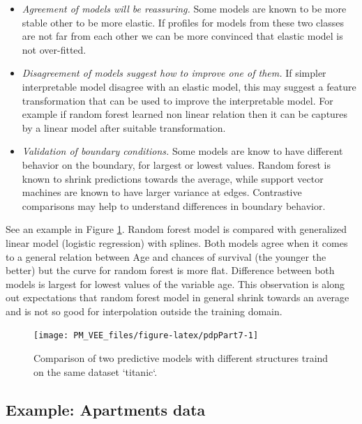 \documentclass[12pt,]{krantz}
\providecommand{\tightlist}{%
  \setlength{\itemsep}{0pt}\setlength{\parskip}{0pt}}
\begin{document}
\begin{itemize}
\tightlist
\item
  \emph{Agreement of models will be reassuring.} Some models are known to be more stable other to be more elastic. If profiles for models from these two classes are not far from each other we can be more convinced that elastic model is not over-fitted.
\item
  \emph{Disagreement of models suggest how to improve one of them.} If simpler interpretable model disagree with an elastic model, this may suggest a feature transformation that can be used to improve the interpretable model. For example if random forest learned non linear relation then it can be captures by a linear model after suitable transformation.
\item
  \emph{Validation of boundary conditions.} Some models are know to have different behavior on the boundary, for largest or lowest values. Random forest is known to shrink predictions towards the average, while support vector machines are known to have larger variance at edges. Contrastive comparisons may help to understand differences in boundary behavior.
\end{itemize}

See an example in Figure \ref{fig:pdpPart7}. Random forest model is compared with generalized linear model (logistic regression) with splines. Both models agree when it comes to a general relation between Age and chances of survival (the younger the better) but the curve for random forest is more flat. Difference between both models is largest for lowest values of the variable age. This observation is along out expectations that random forest model in general shrink towards an average and is not so good for interpolation outside the training domain.

\begin{figure}

{\centering \texttt{[image: PM\_VEE\_files/figure-latex/pdpPart7-1]} 

}

\caption{Comparison of two predictive models with different structures traind on the same dataset `titanic`.}\label{fig:pdpPart7}
\end{figure}

\hypertarget{PDPExample}{%
\subsection{Example: Apartments data}\label{PDPExample}}
\end{document}
